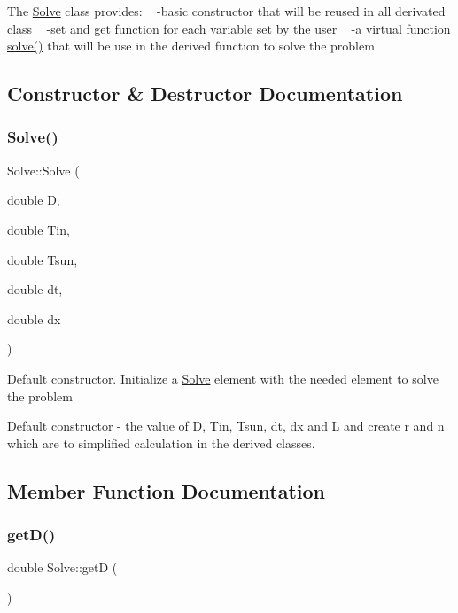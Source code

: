 The \hyperlink{class_solve}{Solve} class provides\+: ~\newline
-\/basic constructor that will be reused in all derivated class ~\newline
-\/set and get function for each variable set by the user ~\newline
-\/a virtual function \hyperlink{class_solve_a1a56722993fdabea9928637d7dd8a2c7}{solve()} that will be use in the derived function to solve the problem 

\subsection{Constructor \& Destructor Documentation}
\mbox{\label{class_solve_a1e0efad6dcf6b09759dd38df7aa08db8}} 
\subsubsection{\texorpdfstring{Solve()}{Solve()}}
{\footnotesize\ttfamily Solve\+::\+Solve (\begin{DoxyParamCaption}\item[{double}]{D,  }\item[{double}]{Tin,  }\item[{double}]{Tsun,  }\item[{double}]{dt,  }\item[{double}]{dx }\end{DoxyParamCaption})}

Default constructor. Initialize a \hyperlink{class_solve}{Solve} element with the needed element to solve the problem

Default constructor -\/  the value of D, Tin, Tsun, dt, dx and L and create r and n which are to simplified calculation in the derived classes. 

\subsection{Member Function Documentation}
\mbox{\label{class_solve_a0edcf69bae8414576fbb1b35ba395a1c}} 
\subsubsection{\texorpdfstring{get\+D()}{getD()}}
{\footnotesize\ttfamily double Solve\+::getD (\begin{DoxyParamCaption}{ }\end{DoxyParamCaption})}

